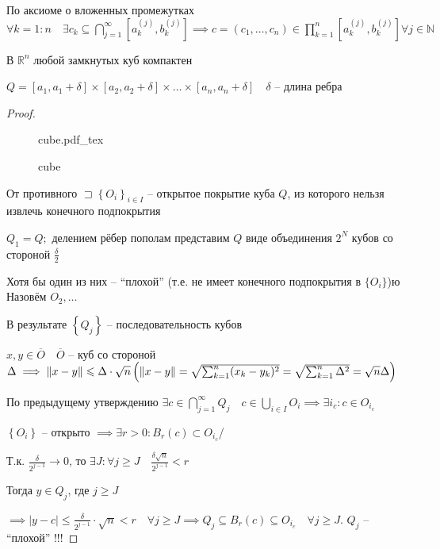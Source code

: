\documentclass{book}
\newcommand\N{\ensuremath{\mathbb{N}}}
\newcommand\R{\ensuremath{\mathbb{R}}}
\newcommand{\ov}[1]{\overline{#1}}
\theoremstyle{definition}
\newcommand{\incfig}[1]{%
    \def\svgwidth{\columnwidth}
    {#1.pdf_tex}
}
\begin{document}
По аксиоме о вложенных промежутках $ \forall k=1:n\quad \exists c_k \subseteq \bigcap\limits_{j=1}^{\infty } [a_k^{\left( j \right) }, b_k^{\left( j \right) }] \implies  c = \left( c_1, \ldots, c_n \right) \in \prod_{k=1}^{n} [a_k^{\left( j \right) }, b_k^{\left( j \right) } ] \forall j\in \N $

\begin{theorem}
     В $ \R^n$ любой замкнутых куб компактен 

    $Q = [a_1, a_1+\delta] \times [a_2, a_2+\delta] \times \ldots\times [a_n, a_n+\delta]\quad \delta$ -- длина ребра
\end{theorem}
\begin{proof}
\begin{figure}[ht]
    \centering
    \incfig{cube}
    \caption{cube}
    \label{fig:cube}
\end{figure}

От противного $\sqsupset \left\{ O_i \right\} _{i\in I}$ -- открытое покрытие куба $Q$, из которого нельзя извлечь конечного подпокрытия

 $Q_1 = Q;$ делением рёбер пополам представим $Q$  виде объединения  $2^N$ кубов со стороной  $\frac{\delta}{2}$ 

 Хотя бы один из них -- ``плохой'' (т.е. не имеет конечного подпокрытия в $\{O_i\}$)ю Назовём  $O_2, \ldots$

 В результате $\left\{ Q_j \right\} $ -- последовательность кубов

 $x, y\in \ov O\quad \ov O$ -- куб со стороной  $\Delta \implies  \|x-y\| \leqslant \Delta \cdot  \sqrt{n} \\ \left( \|x-y\| = \sqrt{\sum_{k=1}^{n} (x_k-y_k)^2} = \sqrt{\sum_{k=1}^{n} \Delta^2} = \sqrt{n} \Delta   \right) $

 По предыдущему утверждению $\exists c\in \bigcap\limits_{j=1}^{\infty } Q_j \quad c\in \bigcup\limits_{i \in  I} O_i \implies \exists i_c: c\in O_{i_c}$

 $\left\{ O_i \right\} $ -- открыто $\implies  \exists r>0: B_r(c)\subset O_{i_c}$/

 Т.к. $\frac{\delta}{2^{j-1}} \to 0$, то $\exists J: \forall j\geqslant J\quad \frac{\delta \sqrt{n} }{2^{j-1}}<r$ 

 Тогда $y\in Q_j$, где $j \geqslant J$

 $\implies \left| y-c \right| \leqslant \frac{\delta}{2^{j-1}}\cdot \sqrt{n}<r\quad \forall j\geqslant J\implies  Q_j\subseteq B_r(c)\subseteq O_{i_c}\quad \forall j\geqslant J $. $Q_j$ -- ``плохой'' !!!

\end{proof}
\end{document}
